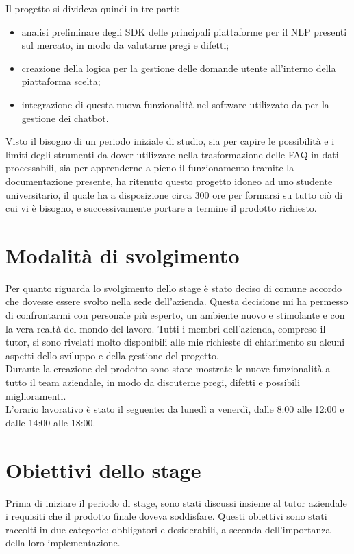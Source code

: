 Il progetto si divideva quindi in tre parti:
\begin{itemize}
	\item analisi preliminare degli SDK delle principali piattaforme per il \gls{NLP} presenti sul mercato, in modo da valutarne pregi e difetti;
	\item creazione della logica per la gestione delle domande utente all'interno della piattaforma scelta;
	\item integrazione di questa nuova funzionalità nel software utilizzato da \azienda{} per la gestione dei \gls{chatbot}. 
\end{itemize}
Visto il bisogno di un periodo iniziale di studio, sia per capire le possibilità e i limiti degli strumenti da dover utilizzare nella trasformazione delle \gls{FAQ} in dati processabili, sia per apprenderne a pieno il funzionamento tramite la documentazione presente, \azienda{} ha ritenuto questo progetto idoneo ad uno studente universitario, il quale ha a disposizione circa 300 ore per formarsi su tutto ciò di cui vi è bisogno, e successivamente portare a termine il prodotto richiesto.

\section{Modalità di svolgimento}
Per quanto riguarda lo svolgimento dello stage è stato deciso di comune accordo che dovesse essere svolto nella sede dell'azienda. Questa decisione mi ha permesso di confrontarmi con personale più esperto, un ambiente nuovo e stimolante e con la vera realtà del mondo del lavoro. Tutti i membri dell'azienda, compreso il tutor, si sono rivelati molto disponibili alle mie richieste di chiarimento su alcuni aspetti dello sviluppo e della gestione del progetto.\\
Durante la creazione del prodotto sono state mostrate le nuove funzionalità a tutto il team aziendale, in modo da discuterne pregi, difetti e possibili miglioramenti. \\
L'orario lavorativo è stato il seguente: da lunedì a venerdì, dalle 8:00 alle 12:00 e dalle 14:00 alle 18:00.

\section{Obiettivi dello stage}
\label{obiettivi}
Prima di iniziare il periodo di stage, sono stati discussi insieme al tutor aziendale i requisiti che il prodotto finale doveva soddisfare. Questi obiettivi sono stati raccolti in due categorie: obbligatori e desiderabili, a seconda dell'importanza della loro implementazione.

